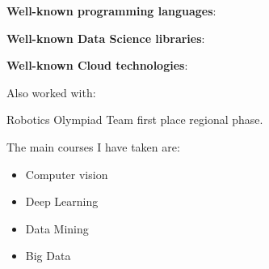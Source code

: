 
\textbf{Well-known programming languages}:
\begin{center}
\end{center}
\divider{}

\textbf{Well-known Data Science libraries}:
\begin{center}
\end{center}
\divider{}

\textbf{Well-known Cloud technologies}:
\begin{center}
\end{center}
\divider{}

Also worked with:
\begin{center}
\end{center}
\divider{}


\cvachievement{\faTrophy}
{Robotics Olympiad \smallskip}
{\small{}%
  \small{}}
Team first place regional phase.

\medskip

The main courses I have taken are:
\begin{itemize}
  \item Computer vision
  \item Deep Learning
  \item Data Mining
  \item Big Data
\end{itemize}


